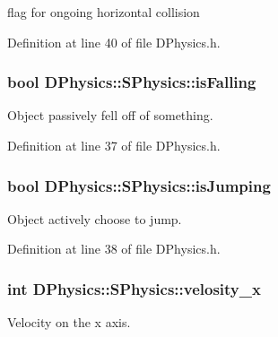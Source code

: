 flag for ongoing horizontal collision 



Definition at line 40 of file D\-Physics.\-h.

\hypertarget{structDPhysics_1_1SPhysics_a39163a65d84fc6d7fd0be57560cffe12}{
\subsubsection[{is\-Falling}]{\setlength{\rightskip}{0pt plus 5cm}bool D\-Physics\-::\-S\-Physics\-::is\-Falling}}\label{structDPhysics_1_1SPhysics_a39163a65d84fc6d7fd0be57560cffe12}


Object passively fell off of something. 



Definition at line 37 of file D\-Physics.\-h.

\hypertarget{structDPhysics_1_1SPhysics_a6fc3e1a46d84fb6dec9f198bb6513856}{
\subsubsection[{is\-Jumping}]{\setlength{\rightskip}{0pt plus 5cm}bool D\-Physics\-::\-S\-Physics\-::is\-Jumping}}\label{structDPhysics_1_1SPhysics_a6fc3e1a46d84fb6dec9f198bb6513856}


Object actively choose to jump. 



Definition at line 38 of file D\-Physics.\-h.

\hypertarget{structDPhysics_1_1SPhysics_a2654e1fd65ea35fe4119c7866fd46274}{
\subsubsection[{velosity\-\_\-x}]{\setlength{\rightskip}{0pt plus 5cm}int D\-Physics\-::\-S\-Physics\-::velosity\-\_\-x}}\label{structDPhysics_1_1SPhysics_a2654e1fd65ea35fe4119c7866fd46274}


Velocity on the x axis. 

